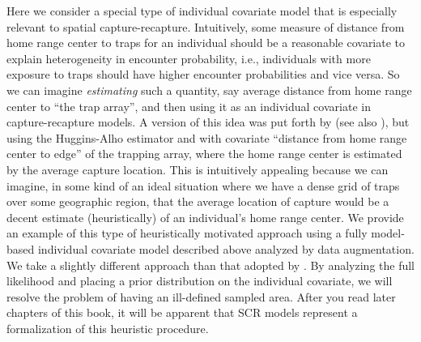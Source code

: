 Here we consider a special type of individual covariate model that is
especially relevant to spatial capture-recapture.
Intuitively, some measure of  distance from home range center to
traps for an individual should be a reasonable  covariate to explain
heterogeneity in encounter probability, i.e., individuals with more
exposure to traps should have higher encounter probabilities and vice
versa. So we can imagine {\it estimating} such a  quantity, say average
distance from home range center to ``the trap array'', and then using
it as an individual covariate in capture-recapture models. 
 A version of this idea was put forth by
\citet{boulanger_mclellan:2001} (see also \citet{ivan:2012}), but
using the Huggins-Alho estimator and with covariate ``distance from
home range center to
edge'' of the trapping array, where the home range center is estimated
by the average capture location.
This is intuitively appealing because we can imagine, in some kind of
an ideal situation where  we have a dense grid of traps over some geographic
region, that
 the average location of capture would be a decent
estimate (heuristically) of an individual's home range center.
We provide an example of this type of heuristically motivated
approach using a fully model-based individual covariate model
described above analyzed by data augmentation. We take a slightly
different approach than that adopted by
\citet{boulanger_mclellan:2001}. By analyzing the full likelihood and
placing a prior distribution on the individual covariate, we will
resolve 
the problem of having an ill-defined sampled area.
After you read later chapters of this book, it
will be apparent that SCR models represent a formalization of this
heuristic procedure.





